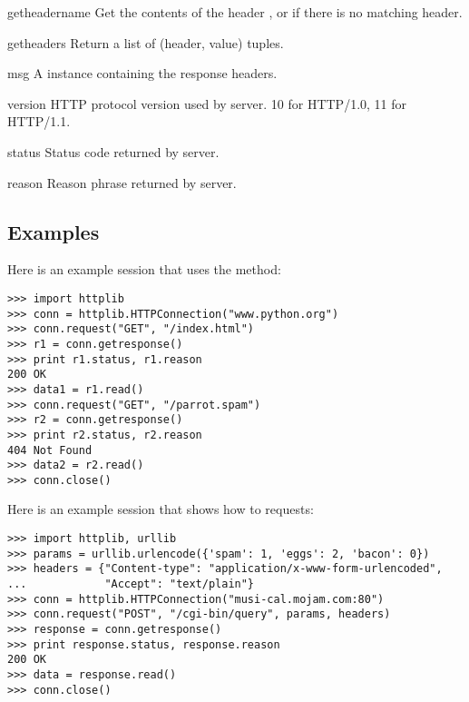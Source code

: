 \begin{methoddesc}{getheader}{name}
Get the contents of the header , or  if there is no
matching header.
\end{methoddesc}

\begin{methoddesc}{getheaders}{}
Return a list of (header, value) tuples. 
\end{methoddesc}

\begin{datadesc}{msg}
  A  instance containing the response headers.
\end{datadesc}

\begin{datadesc}{version}
  HTTP protocol version used by server.  10 for HTTP/1.0, 11 for HTTP/1.1.
\end{datadesc}

\begin{datadesc}{status}
  Status code returned by server.
\end{datadesc}

\begin{datadesc}{reason}
  Reason phrase returned by server.
\end{datadesc}


\subsection{Examples \label{httplib-examples}}

Here is an example session that uses the  method:

\begin{verbatim}
>>> import httplib
>>> conn = httplib.HTTPConnection("www.python.org")
>>> conn.request("GET", "/index.html")
>>> r1 = conn.getresponse()
>>> print r1.status, r1.reason
200 OK
>>> data1 = r1.read()
>>> conn.request("GET", "/parrot.spam")
>>> r2 = conn.getresponse()
>>> print r2.status, r2.reason
404 Not Found
>>> data2 = r2.read()
>>> conn.close()
\end{verbatim}

Here is an example session that shows how to  requests:

\begin{verbatim}
>>> import httplib, urllib
>>> params = urllib.urlencode({'spam': 1, 'eggs': 2, 'bacon': 0})
>>> headers = {"Content-type": "application/x-www-form-urlencoded",
...            "Accept": "text/plain"}
>>> conn = httplib.HTTPConnection("musi-cal.mojam.com:80")
>>> conn.request("POST", "/cgi-bin/query", params, headers)
>>> response = conn.getresponse()
>>> print response.status, response.reason
200 OK
>>> data = response.read()
>>> conn.close()
\end{verbatim}
